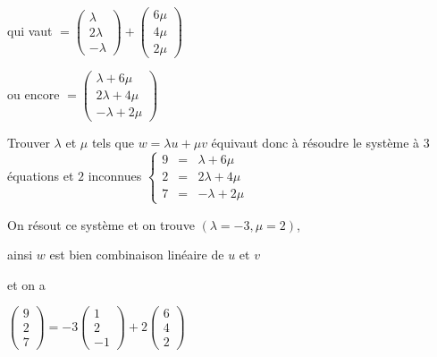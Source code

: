  \change
 
 qui vaut  $  =  \left(\begin{matrix}\lambda\\ 2\lambda\\ -\lambda\end{matrix}\right) 
     + \left(\begin{matrix}6\mu\\ 4\mu\\ 2\mu\end{matrix}\right)$
   
   \change 
   
 ou encore $ =  \left(\begin{matrix}\lambda + 6\mu\\ 2\lambda + 4\mu\\ -\lambda + 2\mu\end{matrix}\right)$  
   
   \change 
  
  Trouver $\lambda$ et $\mu$ tels que $w=\lambda u + \mu v$ équivaut donc à résoudre le système 
  à $3$ équations et $2$ inconnues 
  $\left\{
\begin{array}{rcl}
9 & = & \lambda + 6\mu\\ 2 & = & 2\lambda + 4\mu\\ 7 & = & -\lambda + 2\mu 
\end{array}\right.
$

  \change
  
  On résout ce système et on trouve  $(\lambda = -3, \mu = 2)$,
  
  \change
  
ainsi  $w$ est bien combinaison linéaire de $u$ et $v$

  \change 
  
  et on a 

  $\left(\begin{smallmatrix}9\\2\\7\end{smallmatrix}\right)
=  -3\left(\begin{smallmatrix}1\\2\\-1\end{smallmatrix}\right) 
+ 2\left(\begin{smallmatrix}6\\4\\2\end{smallmatrix}\right)$


\diapo

